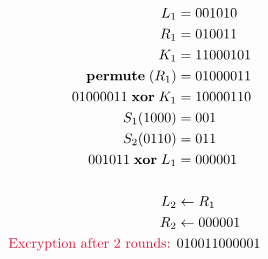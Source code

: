 \begin{Answer}
\begin{multicols}{2}
\bigskip
{}

\begin{align*}
L_{1} &= 001010\\
R_{1} &= 010011\\
K_{1} &= 11000101\\
\perm{R_{1}} &= 01000011\\
01000011 \xor K_{1} &= 10000110\\
S_{1}(1000) &= 001\\
S_{2}(0110) &= 011\\
001011 \xor L_{1} &= 000001\\
\\
L_{2} &\gets R_{1}\\
R_{2} &\gets 000001\\
\text{\crim{Excryption after 2 rounds: }} &010011000001\\
\end{align*}

\end{multicols}

\end{Answer}
